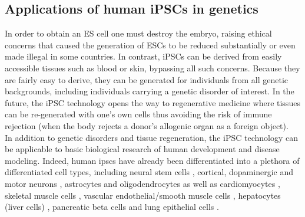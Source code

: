 




\subsection{Applications of human iPSCs in genetics}
\label{sec:ips_genetics}

In order to obtain an ES cell one must destroy the embryo, raising ethical concerns that caused the generation of ESCs to be reduced substantially or even made illegal in some countries.
In contrast, iPSCs can be derived from easily accessible tissues such as blood or skin, bypassing all such concerns.
Because they are fairly easy to derive, they can be generated for individuals from all genetic backgrounds, including individuals carrying a genetic disorder of interest.
In the future, the iPSC technology opens the way to regenerative medicine where tissues can be re-generated with one's own cells thus avoiding the risk of immune rejection (when the body rejects a donor's allogenic organ as a foreign object).\\

In addition to genetic disorders and tissue regeneration, the iPSC technology can be applicable to basic biological research of human development and disease modeling.
Indeed, human \glspl{ipsc} have already been differentiated into a plethora of differentiated cell types, including
neural stem cells \cite{d2014large}, 
cortical, dopaminergic 
and motor neurons \cite{shi2012human, kriks2011dopamine, karumbayaram2009directed},
astrocytes \cite{shaltouki2013efficient} and
oligodendrocytes \cite{douvaras2014efficient} 
as well as
cardiomyocytes \cite{burridge2014chemically}, 
skeletal muscle cells \cite{maffioletti2015efficient}, 
vascular endothelial/smooth muscle cells \cite{patsch2015generation}, 
hepatocytes (liver cells) \cite{si2010highly},
pancreatic beta cells \cite{zhang2009highly} and 
lung epithelial cells \cite{huang2014efficient}.\\

